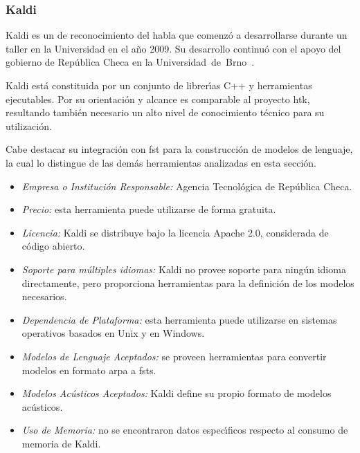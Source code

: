 \subsubsection{Kaldi}
\label{sec:kaldi}

Kaldi es un  de reconocimiento del habla que comenz\'o a desarrollarse durante un taller
en la Universidad  en el a\~no 2009. Su desarrollo continu\'o con el apoyo del gobierno
de Rep\'ublica Checa en la \mbox{Universidad de Brno \cite{Povey_ASRU2011}}.

Kaldi est\'a constituida por un conjunto de librer{\'\i}as C++ y herramientas ejecutables. Por su orientaci\'on y
alcance es comparable al proyecto \gls{htk}, resultando tambi\'en necesario un alto nivel de conocimiento t\'ecnico
para su utilizaci\'on.

Cabe destacar su integraci\'on con \gls{fst} para la
construcci\'on de modelos de lenguaje, la cual lo distingue de las dem\'as herramientas analizadas en esta secci\'on.

\begin{itemize}
	\item \emph{Empresa o Instituci\'on Responsable:} Agencia Tecnol\'ogica de Rep\'ublica Checa.
	\item \emph{Precio:} esta herramienta puede utilizarse de forma gratuita.
	\item \emph{Licencia:} Kaldi se distribuye bajo la licencia Apache 2.0, considerada de c\'odigo abierto.
	\item \emph{Soporte para m\'ultiples idiomas:} Kaldi no provee soporte para ning\'un
	idioma directamente, pero proporciona herramientas para la definici\'on de los modelos necesarios.
	\item \emph{Dependencia de Plataforma:} esta herramienta puede utilizarse en sistemas operativos
	basados en Unix y en Windows.
	\item \emph{Modelos de Lenguaje Aceptados:} se proveen herramientas para convertir modelos en formato
	\gls{arpa} a \gls{fst}s.
	\item \emph{Modelos Ac\'usticos Aceptados:} Kaldi define su propio formato de modelos ac\'usticos.
	\item \emph{Uso de Memoria:} no se encontraron datos espec{\'\i}ficos respecto al consumo de memoria
	de Kaldi.
\end{itemize}